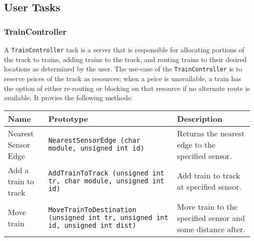 \documentclass[12pt]{article}
\begin{document}
\subsection{User Tasks}
\subsubsection{TrainController}
A {\tt TrainController} task is a server that is responsible for allocating portions of the track to trains, adding trains to the track, and routing trains to their desired locations as determined by the user.  The use-case of the {\tt TrainController} is to reserve peices of the track as resources; when a peice is unavailable, a train has the option of either re-routing or blocking on that resource if no alternate route is available.  It provies the following methods:
\begin{center}
  \begin{tabular}{|l|p{}|p{}|}
    \hline
    {\bf Name} & {\bf Prototype} & {\bf Description} \\\hline
    Nearest Sensor Edge & {\tt NearestSensorEdge (char module, unsigned int id)} & Returns the nearest edge to the specified sensor. \\\hline
    Add a train to track & {\tt AddTrainToTrack (unsigned int tr, char module, unsigned int id)} & Add train to track at specified sensor. \\\hline
    Move train & {\tt MoveTrainToDestination (unsigned int tr, unsigned int id, unsigned int dist)} & Move train to the specified sensor and some distance after. \\\hline
  \end{tabular}
  \\
\end{center}
\end{document}
